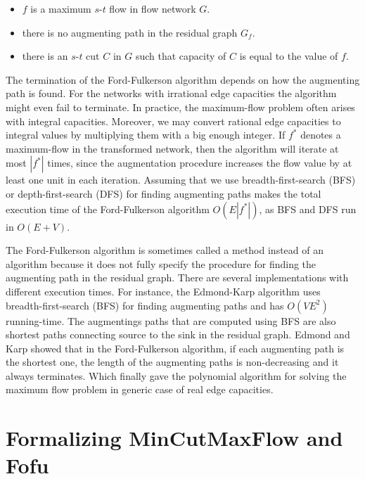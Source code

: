\documentclass{llncs}
\begin{document}
\begin{itemize}
\item $f$ is a maximum $s$-$t$ flow in flow network $G$.
\item there is no augmenting path in the residual graph $G_f$.
\item there is an $s$-$t$ cut $C$ in $G$ such that capacity of $C$ is equal to the value of $f$.
\end{itemize}

The termination of the Ford-Fulkerson algorithm depends on how the augmenting path is found. For the networks with irrational edge capacities the algorithm might even fail to terminate. In practice, the maximum-flow problem often arises with integral capacities. Moreover, we may convert rational edge capacities to integral values by multiplying them with a big enough integer. If $f^*$ denotes a maximum-flow in the transformed network, then the algorithm will iterate at most $|f^*|$ times, since the augmentation procedure increases the flow value by at least one unit in each iteration. Assuming that we use breadth-first-search (BFS) or depth-first-search (DFS) for finding augmenting paths makes the total execution time of the Ford-Fulkerson algorithm $O ( E | f^* |)$, as BFS and DFS run in $O (E + V)$.

The Ford-Fulkerson algorithm is sometimes called a method instead of an algorithm because it does not fully specify the procedure for finding the augmenting path in the residual graph. There are several implementations with different execution times. For instance, the Edmond-Karp algorithm uses breadth-first-search (BFS) for finding augmenting paths and has $O (VE^2)$ running-time. The augmentings paths that are computed using BFS are also shortest paths connecting source to the sink in the residual graph. Edmond and Karp showed that in the Ford-Fulkerson algorithm, if each augmenting path is the shortest one, the length of the augmenting paths is non-decreasing and it always terminates. Which finally gave the polynomial algorithm for solving the maximum flow problem in generic case of real edge capacities.


\section{Formalizing MinCutMaxFlow and Fofu}
%
%    
%      
%    
%    
\end{document}
